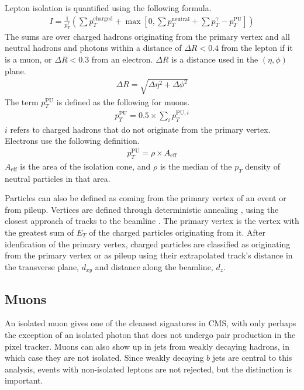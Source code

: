 Lepton isolation is quantified using the following formula.
\begin{gather}
  I = \frac{1}{p_T^\ell} \left(\sum p_T^\mathrm{charged} +
      \max\left[0, \sum p_T^\mathrm{neutral} +
               \sum p_T^\mathrm{\gamma} - p_T^\mathrm{PU}
               \right]\right) \label{eq:isolation}
\end{gather}
The sums are over charged hadrons originating from the primary vertex
and all neutral hadrons and photons within a distance of $\Delta R < 0.4$
from the lepton if it is a muon, or $\Delta R < 0.3$ from an electron.
$\Delta R$ is a distance used in the $(\eta, \phi)$ plane.
\begin{gather}
  \Delta R = \sqrt{\Delta\eta^2 + \Delta\phi^2}
\end{gather}
The term $p_T^\mathrm{PU}$ is defined as the following for muons.
\begin{gather}
  p_T^\mathrm{PU} = 0.5 \times \sum_i p_T^{\mathrm{PU},i}
\end{gather}
$i$ refers to charged hadrons that do not originate from the primary vertex.
Electrons use the following definition.
\begin{gather}
  p_T^\mathrm{PU} = \rho \times A_\mathrm{eff}
\end{gather}
$A_\mathrm{eff}$ is the area of the isolation cone,
and $\rho$ is the median of the $p_T$ density of neutral particles in that area.

Particles can also be defined as coming from the primary vertex of an event or from pileup.
Vertices are defined through deterministic annealing \cite{726788},
using the closest approach of tracks to the beamline \cite{Collaboration_2014}.
The primary vertex is the vertex with
the greatest sum of $E_T$ of the charged particles originating from it.
After idenfication of the primary vertex,
charged particles are classified as originating from the primary vertex or as pileup
using their extrapolated track's distance in the transverse plane, $d_{xy}$
and distance along the beamline, $d_z$.

\subsection{Muons} \label{sec:muon-def}

An isolated muon gives one of the cleanest signatures in CMS,
with only perhaps the exception of an isolated photon that does not
undergo pair production in the pixel tracker.
Muons can also show up in jets from weakly decaying hadrons,
in which case they are not isolated.
Since weakly decaying $b$ jets are central to this analysis,
events with non-isolated leptons are not rejected,
but the distinction is important.

